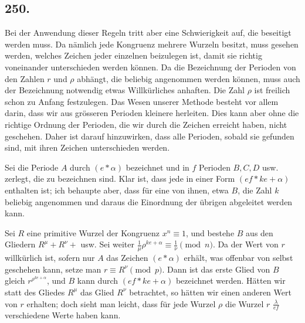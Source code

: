 \documentclass[12pt]{article}
\begin{document}
\subsection*{250.}
Bei der Anwendung dieser Regeln tritt aber eine Schwierigkeit auf, die beseitigt werden muss. Da nämlich jede Kongruenz mehrere Wurzeln besitzt, muss gesehen werden, welches Zeichen jeder einzelnen beizulegen ist, damit sie richtig voneinander unterschieden werden können. Da die Bezeichnung der Perioden von den Zahlen $r$ und $\rho$ abhängt, die beliebig angenommen werden können, muss auch der Bezeichnung notwendig etwas Willkürliches anhaften. Die Zahl $\rho$ ist freilich schon zu Anfang festzulegen. Das Wesen unserer Methode besteht vor allem darin, dass wir aus grösseren Perioden kleinere herleiten. Dies kann aber ohne die richtige Ordnung der Perioden, die wir durch die Zeichen erreicht haben, nicht geschehen. Daher ist darauf hinzuwirken, dass alle Perioden, sobald sie gefunden sind, mit ihren Zeichen unterschieden werden.

Sei die Periode $A$ durch $(e*\alpha)$ bezeichnet und in $f$ Perioden $B,C,D$ usw. zerlegt, die zu bezeichnen sind. Klar ist, dass jede in einer Form $(ef*ke+\alpha)$ enthalten ist; ich behaupte aber, dass für eine von ihnen, etwa $B$, die Zahl $k$ beliebig angenommen und daraus die Einordnung der übrigen abgeleitet werden kann.

Sei $R$ eine primitive Wurzel der Kongruenz $x^n\equiv 1$, und bestehe $B$ aus den Gliedern $R^\mu+R^\nu+$ usw. Sei weiter $\frac{1}{\mu}\rho^{ke+\alpha}\equiv \frac{1}{\nu}\pmod n$. Da der Wert von $r$ willkürlich ist, sofern nur $A$ das Zeichen $(e*\alpha)$ erhält, was offenbar von selbst geschehen kann, setze man $r\equiv R^\nu\pmod p$. Dann ist das erste Glied von $B$ gleich $r^{\rho^{ke+\alpha}}$, und $B$ kann durch $(ef*ke+\alpha)$ bezeichnet werden. Hätten wir statt des Gliedes $R^\mu$ das Glied $R^\nu$ betrachtet, so hätten wir einen anderen Wert von $r$ erhalten; doch sieht man leicht, dass für jede Wurzel $\rho$ die Wurzel $r$ $\frac{\lambda}{ef}$ verschiedene Werte haben kann.
\end{document}
